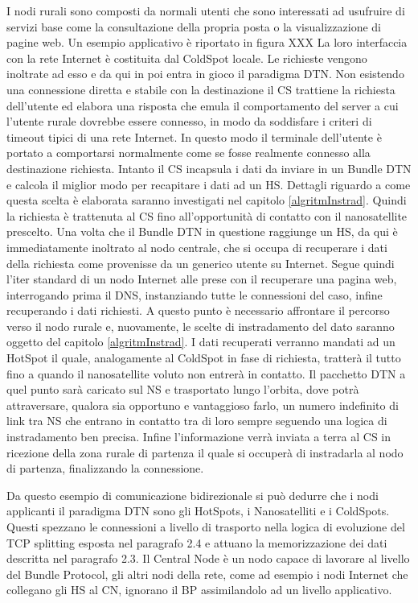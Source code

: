 \documentclass[12pt,a4paper,oneside]{book}
\begin{document}
		I nodi rurali sono composti da normali utenti che sono interessati ad usufruire di servizi base come la consultazione della propria posta o la visualizzazione di pagine web. Un esempio applicativo è riportato in figura XXX La loro interfaccia con la rete Internet è costituita dal ColdSpot locale. Le richieste vengono inoltrate ad esso e da qui in poi entra in gioco il paradigma DTN. Non esistendo una connessione diretta e stabile con la destinazione il CS trattiene la richiesta dell'utente ed elabora una risposta che emula il comportamento del server a cui l'utente rurale dovrebbe essere connesso, in modo da soddisfare i criteri di timeout tipici di una rete Internet. In questo modo il terminale dell'utente è portato a comportarsi normalmente come se fosse realmente connesso alla destinazione richiesta. Intanto il CS incapsula i dati da inviare in un Bundle DTN e calcola il miglior modo per recapitare i dati ad un HS. Dettagli riguardo a come questa scelta è elaborata saranno investigati nel capitolo \ref{algritmInstrad}. Quindi la richiesta è trattenuta al CS fino all'opportunità di contatto con il nanosatellite prescelto. Una volta che il Bundle DTN in questione raggiunge un HS, da qui è immediatamente inoltrato al nodo centrale, che si occupa di recuperare i dati della richiesta come provenisse da un generico utente su Internet. Segue quindi l'iter standard di un nodo Internet alle prese con il recuperare una pagina web, interrogando prima il DNS, instanziando tutte le connessioni del caso, infine recuperando i dati richiesti. A questo punto è necessario affrontare il percorso verso il nodo rurale e, nuovamente, le scelte di instradamento del dato saranno oggetto del capitolo \ref{algritmInstrad}. I dati recuperati verranno mandati ad un HotSpot il quale, analogamente al ColdSpot in fase di richiesta, tratterà il tutto fino a quando il nanosatellite voluto non entrerà in contatto. Il pacchetto DTN a quel punto sarà caricato sul NS e trasportato lungo l'orbita, dove potrà attraversare, qualora sia opportuno e vantaggioso farlo, un numero indefinito di link tra NS che entrano in contatto tra di loro sempre seguendo una logica di instradamento ben precisa. Infine l'informazione verrà inviata a terra al CS in ricezione della zona rurale di partenza il quale si occuperà di instradarla al nodo di partenza, finalizzando la connessione.

		Da questo esempio di comunicazione bidirezionale si può dedurre che i nodi applicanti il paradigma DTN sono gli HotSpots, i Nanosatelliti e i ColdSpots. Questi spezzano le connessioni a livello di trasporto nella logica di evoluzione del TCP splitting esposta nel paragrafo 2.4 e attuano la memorizzazione dei dati descritta nel paragrafo 2.3. Il Central Node è un nodo capace di lavorare al livello del Bundle Protocol, gli altri nodi della rete, come ad esempio i nodi Internet che collegano gli HS al CN, ignorano il BP assimilandolo ad un livello applicativo. 
	
\end{document}
